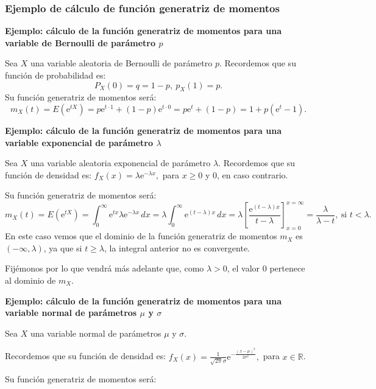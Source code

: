 \documentclass[]{book}
\begin{document}
\hypertarget{ejemplo-de-cuxe1lculo-de-funciuxf3n-generatriz-de-momentos}{%
\subsubsection{Ejemplo de cálculo de función generatriz de momentos}\label{ejemplo-de-cuxe1lculo-de-funciuxf3n-generatriz-de-momentos}}

\textbf{Ejemplo: cálculo de la función generatriz de momentos para una variable de Bernoulli de parámetro \(p\)}

Sea \(X\) una variable aleatoria de Bernoulli de parámetro \(p\). Recordemos que su función de probabilidad es:
\[
P_X(0)=q=1-p,\ p_X(1)=p.
\]
Su función generatriz de momentos será:
\[
m_X (t)=E\left(\mathrm{e}^{tX}\right) =p\mathrm{e}^{t\cdot 1}+(1-p)\mathrm{e}^{t\cdot 0}=p\mathrm{e}^t+(1-p)=1+p\left(\mathrm{e}^t -1 \right).
\]

\textbf{Ejemplo: cálculo de la función generatriz de momentos para una variable exponencial de parámetro \(\lambda\)}

Sea \(X\) una variable aleatoria exponencial de parámetro \(\lambda\). Recordemos que su función de densidad es: \(f_X(x)=\lambda \mathrm{e}^{-\lambda x},\) para \(x\geq 0\) y \(0\), en caso contrario.

Su función generatriz de momentos será:
\[
m_X (t)=E\left(\mathrm{e}^{tX}\right)=\int_0^\infty \mathrm{e}^{t x}\lambda \mathrm{e}^{-\lambda x}\, dx = \lambda \int_0^\infty\mathrm{e}^{(t-\lambda)x}\, dx = \lambda\left[\frac{\mathrm{e}^{(t-\lambda)x}}{t-\lambda}\right]_{x=0}^{x=\infty} = \frac{\lambda}{\lambda -t},\ \mbox{si } t<\lambda. 
\]
En este caso vemos que el dominio de la función generatriz de momentos \(m_X\) es \((-\infty,\lambda)\), ya que si \(t\geq \lambda\), la integral anterior no es convergente.

Fijémonos por lo que vendrá más adelante que, como \(\lambda >0\), el valor \(0\) pertenece al dominio de \(m_X\).

\textbf{Ejemplo: cálculo de la función generatriz de momentos para una variable normal de parámetros \(\mu\) y \(\sigma\)}

Sea \(X\) una variable normal de parámetros \(\mu\) y \(\sigma\).

Recordemos que su función de densidad es: \(f_X(x)=\frac{1}{\sqrt{2\pi}\sigma}\mathrm{e}^{-\frac{(x-\mu)^2}{2\sigma^2}},\) para \(x\in \mathbb{R}\).

Su función generatriz de momentos será:
\end{document}
